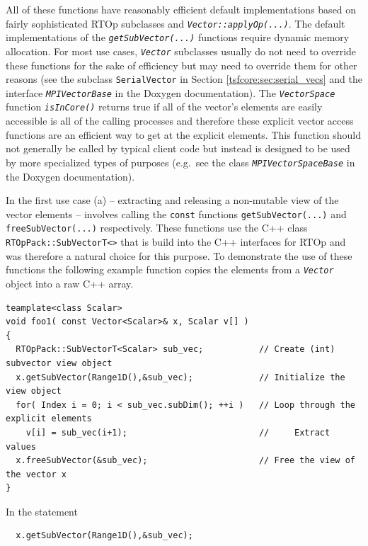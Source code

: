 {}\noindent{}All of these functions have reasonably efficient default
implementations based on fairly sophisticated RTOp subclasses and
{}\texttt{\textit{Vector::applyOp(\-...)}}.  The default
implementations of the {}\texttt{\textit{getSubVector(...)}} functions
require dynamic memory allocation.  For most use cases,
{}\texttt{\textit{Vector}} subclasses usually do not need to override
these functions for the sake of efficiency but may need to override them
for other reasons (see the subclass {}\texttt{SerialVector} in Section
{}\ref{tsfcore:sec:serial_vecs} and the interface
{}\texttt{\textit{MPI\-Vector\-Base}} in the Doxygen documentation).
The {}\texttt{\textit{Vector\-Space}} function
{}\texttt{\textit{isInCore()}} returns true if all of the vector's
elements are easily accessible is all of the calling processes and
therefore these explicit vector access functions are an efficient way to
get at the explicit elements.  This function should not generally be
called by typical client code but instead is designed to be used by
more specialized types of purposes (e.g.~see the class
{}\texttt{\textit{MPI\-Vector\-Space\-Base}} in the Doxygen
documentation).

In the first use case (a) -- extracting and releasing a non-mutable
view of the vector elements -- involves calling the {}\texttt{const}
functions {}\texttt{get\-Sub\-Vector(...)} and
{}\texttt{free\-Sub\-Vector(...)}  respectively.  These functions use
the C++ class {}\texttt{RTOp\-Pack::\-Sub\-VectorT<>} that is build
into the C++ interfaces for RTOp and was therefore a natural choice
for this purpose.  To demonstrate the use of these functions the
following example function copies the elements from a
{}\texttt{\textit{Vector}} object into a raw C++ array.

{\scriptsize\begin{verbatim}
teamplate<class Scalar>
void foo1( const Vector<Scalar>& x, Scalar v[] )
{
  RTOpPack::SubVectorT<Scalar> sub_vec;           // Create (int) subvector view object
  x.getSubVector(Range1D(),&sub_vec);             // Initialize the view object
  for( Index i = 0; i < sub_vec.subDim(); ++i )   // Loop through the explicit elements
    v[i] = sub_vec(i+1);                          //     Extract values
  x.freeSubVector(&sub_vec);                      // Free the view of the vector x
}
\end{verbatim}}

{}\noindent{}In the statement

{\scriptsize\begin{verbatim}
  x.getSubVector(Range1D(),&sub_vec);
\end{verbatim}}

